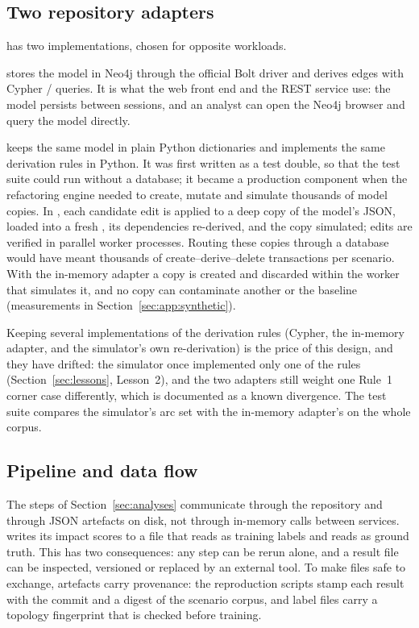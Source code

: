 \subsection{Two repository adapters}
\label{sec:arch:repos}

 has two implementations, chosen for opposite workloads.

 stores the model in Neo4j through the official Bolt driver and derives  edges with Cypher / queries. It is what the web front end and the REST service use: the model persists between sessions, and an analyst can open the Neo4j browser and query the model directly.

 keeps the same model in plain Python dictionaries and implements the same derivation rules in Python. It was first written as a test double, so that the test suite could run without a database; it became a production component when the refactoring engine needed to create, mutate and simulate thousands of model copies. In , each candidate edit is applied to a deep copy of the model's JSON, loaded into a fresh , its dependencies re-derived, and the copy simulated; edits are verified in parallel worker processes. Routing these copies through a database would have meant thousands of create--derive--delete transactions per scenario. With the in-memory adapter a copy is created and discarded within the worker that simulates it, and no copy can contaminate another or the baseline (measurements in Section~\ref{sec:app:synthetic}).

Keeping several implementations of the derivation rules (Cypher, the in-memory adapter, and the simulator's own re-derivation) is the price of this design, and they have drifted: the simulator once implemented only one of the rules (Section~\ref{sec:lessons}, Lesson~2), and the two adapters still weight one Rule~1 corner case differently, which is documented as a known divergence. The test suite compares the simulator's arc set with the in-memory adapter's on the whole corpus.

\subsection{Pipeline and data flow}
\label{sec:arch:pipeline}

The steps of Section~\ref{sec:analyses} communicate through the repository and through JSON artefacts on disk, not through in-memory calls between services.  writes its impact scores to a file that  reads as training labels and  reads as ground truth. This has two consequences: any step can be rerun alone, and a result file can be inspected, versioned or replaced by an external tool. To make files safe to exchange, artefacts carry provenance: the reproduction scripts stamp each result with the commit and a digest of the scenario corpus, and label files carry a topology fingerprint that is checked before training.

